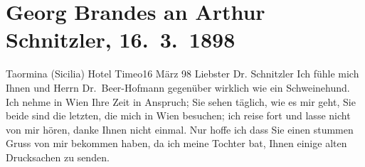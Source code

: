 

         
         \renewcommand{\erwaehntePersonen}{Personen: Richard Beer-Hofmann, Georg Brandes, Emilie Brandes, Gabriele D’Annunzio, Heinrich Heine, Edith Philipp, August von Platen, Louise Schnitzler}
         \renewcommand{\erwaehnteOrte}{Orte: Florenz, Hotel Timeo, Italien, Neapel, Rom, Taormina, Universität La Sapienza, Wien, Wollzeile, Ätna}
         \renewcommand{\erwaehnteWerke}{Werke: Freiwild. Schauspiel in 3 Akten, Lust}
               \section[Georg Brandes an Arthur Schnitzler, 16. 3. 1898]{ Georg Brandes an Arthur Schnitzler, 16. 3. 1898}\nopagebreak{}\rehead{ }\begin{ledgroupsized}[t]{13cm}\normalsize\beginnumbering{} \toendnotes[C]{\smallbreak\pagebreak[2]} 
\toendnotes[C]{\smallbreak}\pstart
           \raggedleft{}{\pb}Taormina (Sicilia) Hotel Timeo16 März 98\pend
           \pstart\center{}Liebster Dr. Schnitzler\pend\pstart
           Ich fühle mich Ihnen und Herrn Dr. Beer-Hofmann gegenüber wirklich wie ein Schweinehund. Ich nehme in Wien Ihre Zeit in Anspruch; Sie sehen täglich, wie
               es mir geht, Sie beide sind die letzten, die mich in Wien besuchen; ich reise fort und lasse nicht von mir hören, danke Ihnen
               nicht einmal. Nur hoffe ich dass Sie einen stummen Gruss von mir bekommen haben, da
               ich meine Tochter bat, Ihnen
               einige alten Drucksachen zu senden.\pend

\end{ledgroupsized}
